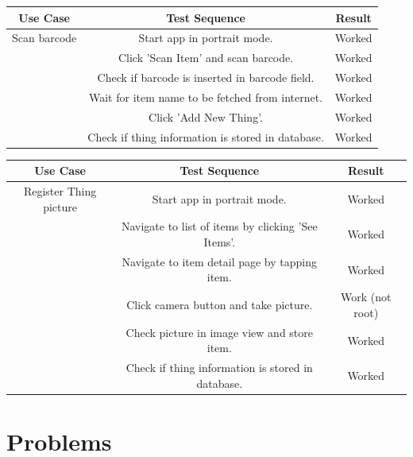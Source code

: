 \documentclass{article} %
\begin{document}
\begin{center}
 \begin{tabular}{||c c c||} 
 \hline
 Use Case & Test Sequence & Result \\ [0.5ex] 
 \hline\hline
 Scan barcode & Start app in portrait mode. & Worked \\ 
 \hline
 & Click 'Scan Item' and scan barcode. & Worked \\
 \hline
 & Check if barcode is inserted in barcode field. & Worked \\
 \hline
 & Wait for item name to be fetched from internet. & Worked \\
 \hline
 & Click 'Add New Thing'. & Worked \\
 \hline
 & Check if thing information is stored in database. & Worked \\ [1ex]
 \hline
\end{tabular}
\end{center}


\begin{center}
 \begin{tabular}{||c c c||} 
 \hline
 Use Case & Test Sequence & Result \\ [0.5ex] 
 \hline\hline
 Register Thing picture & Start app in portrait mode. & Worked \\ 
 \hline
 & Navigate to list of items by clicking 'See Items'. & Worked \\
 \hline
 & Navigate to item detail page by tapping item. & Worked \\
 \hline
 & Click camera button and take picture. & Work (not root) \\
 \hline
 & Check picture in image view and store item. & Worked \\
 \hline
 & Check if thing information is stored in database. & Worked \\ [1ex]
 \hline
\end{tabular}
\end{center}
 



\section{Problems}
\end{document}
